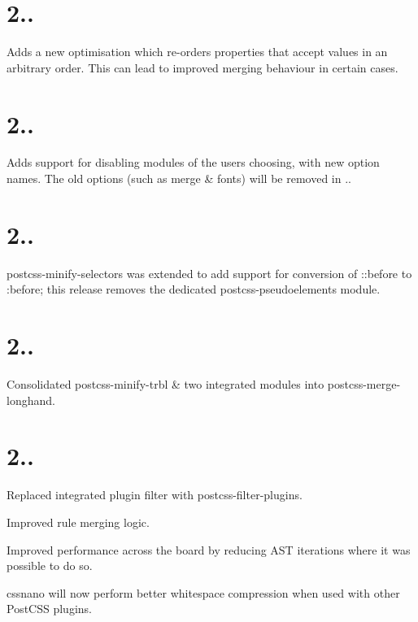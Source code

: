 \section*{2..}


\begin{DoxyItemize}
\item Adds a new optimisation which re-\/orders properties that accept values in an arbitrary order. This can lead to improved merging behaviour in certain cases.
\end{DoxyItemize}

\section*{2..}


\begin{DoxyItemize}
\item Adds support for disabling modules of the user\textquotesingle{}s choosing, with new option names. The old options (such as {\ttfamily merge} \& {\ttfamily fonts}) will be removed in {.}.
\end{DoxyItemize}

\section*{2..}


\begin{DoxyItemize}
\item postcss-\/minify-\/selectors was extended to add support for conversion of {\ttfamily \+::before} to {\ttfamily \+:before}; this release removes the dedicated postcss-\/pseudoelements module.
\end{DoxyItemize}

\section*{2..}


\begin{DoxyItemize}
\item Consolidated postcss-\/minify-\/trbl \& two integrated modules into postcss-\/merge-\/longhand.
\end{DoxyItemize}

\section*{2..}


\begin{DoxyItemize}
\item Replaced integrated plugin filter with postcss-\/filter-\/plugins.
\item Improved rule merging logic.
\item Improved performance across the board by reducing A\+ST iterations where it was possible to do so.
\item cssnano will now perform better whitespace compression when used with other Post\+C\+SS plugins.
\end{DoxyItemize}

